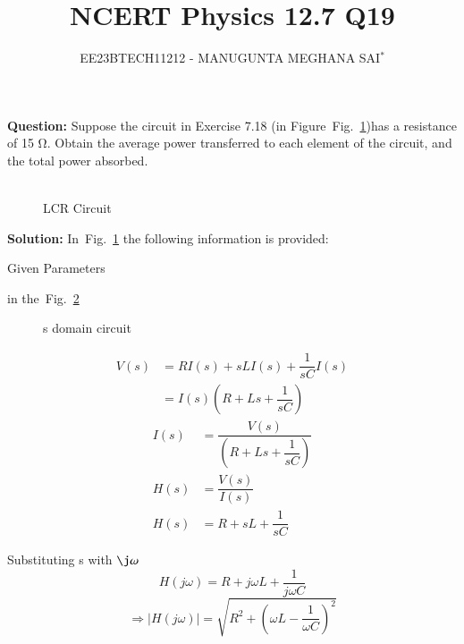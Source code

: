 \documentclass[journal,12pt,twocolumn]{IEEEtran}
\title{
	
\title{NCERT Physics 12.7 Q19}
\author{EE23BTECH11212 - MANUGUNTA MEGHANA SAI$^{*}$%
}


}
\newcommand\figref{Fig.~\ref}
\theoremstyle{remark}
\begin{document}
\maketitle

\textbf{Question:} 
Suppose the circuit in Exercise 7.18 (in Figure~\figref{fig:2})has a resistance of 15 Ω. Obtain the average power transferred to each element of the circuit, and the total power absorbed.\\
\\

\begin{figure}[h]
	\centering
	
	\caption{LCR Circuit}
	\label{fig:2}
\end{figure}
     
\textbf{Solution: }
In~\figref{fig:2} the following information is provided:
 
 

 \begin{table}[h]
 	\centering
 	\resizebox{6 cm}{!}{
 		
 	}
 	\vspace{6 pt}
 	\caption{Given Parameters}
 	\label{tab:my_label} 
 \end{table} 
  in the~\figref{fig:1}
 
 \begin{figure}[!h]
 	\centering
 	
 	\caption{s domain circuit}
 	\label{fig:1}
 	
 \end{figure}
 \begin{align}
 	V(s) &= R I(s) + sL I(s) + \dfrac{1}{sC} I(s)\\
         &= I(s)\left(R + Ls + \dfrac{1}{sC}\right)
 \end{align}
\begin{align}
    I(s) &= \dfrac{V(s)}{\left(R + Ls + \dfrac{1}{sC}\right)}\\ 
    H(s) &= \dfrac{V(s)}{I(s)}\\
	H(s) &= R + sL + \dfrac{1}{sC}
\end{align}

Substituting s with $\j \omega$
\begin{equation}
	H(j\omega) = R + j\omega L + \dfrac{1}{j\omega C}
\end{equation}
\begin{equation}
	\Rightarrow \lvert H(j\omega) \rvert = \sqrt{R^2 + \left(\omega L - \dfrac{1}{\omega C}\right)^2}
	\label{eq:1}
\end{equation}
\end{document}
